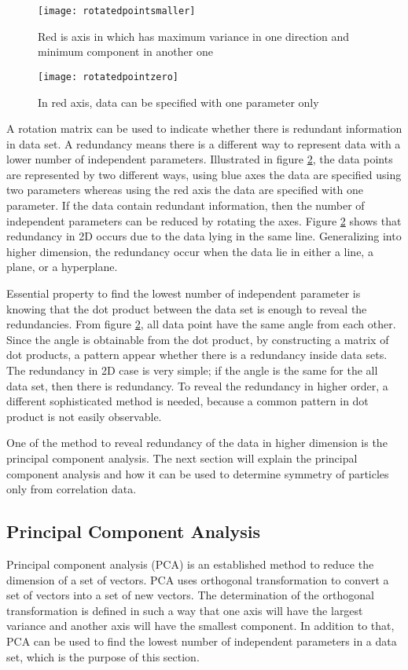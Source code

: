 \begin{figure}[h]
  \centering
  \texttt{[image: rotatedpointsmaller]}
\caption{Red is axis in which has maximum variance in one direction and minimum component in another one}
\label{fig:axissmallercomponent}
\end{figure}

\begin{figure}[h]
  \centering
  \texttt{[image: rotatedpointzero]}
\caption{In red axis, data can be specified with one parameter only}
\label{fig:axisoneparameter}
\end{figure}
A rotation matrix can be used to indicate whether there is redundant information in data set. A redundancy means there is a different way to represent data with a lower number of independent parameters. Illustrated in figure \ref{fig:axisoneparameter}, the data points are represented by two different ways, using blue axes the data are specified using two parameters whereas using the red axis the data are specified with one parameter. If the data contain redundant information, then the number of independent parameters can be reduced by rotating the axes. Figure \ref{fig:axisoneparameter} shows that redundancy in 2D occurs due to the data lying in the same line. Generalizing into higher dimension, the redundancy occur  when the data lie in either a line, a plane, or a hyperplane. 

Essential property to find the lowest number of independent parameter is knowing that the dot product between the  data set is enough to reveal the redundancies.  From figure \ref{fig:axisoneparameter}, all data point have the same angle from each other. Since the angle is obtainable from the dot product, by constructing a matrix of dot products, a pattern appear whether there is a redundancy inside data sets. The redundancy in 2D case is very simple; if the angle is the same for the all data set, then there is redundancy. To reveal the redundancy in higher order, a different sophisticated method is needed, because a common pattern in dot product is not easily observable. 

One of the method to reveal redundancy of the data in higher dimension is the principal component analysis. The next section will explain the principal component analysis and how it can be used to determine symmetry of particles only from correlation data.  

\subsection{Principal Component  Analysis }
Principal component analysis (PCA) is an established method to reduce the dimension of a set of vectors. PCA uses orthogonal transformation to convert a set of vectors into a set of new vectors. The determination of the orthogonal transformation is defined in such a way that one axis will have the largest variance and another axis will have the smallest component. In addition to that, PCA can be used to find the lowest number of independent parameters in a data set, which is the purpose of this section. 

